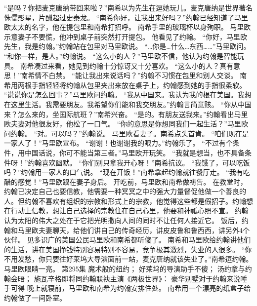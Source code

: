 \documentclass[a4paper,12pt,UTF8,twoside]{ctexbook}
\begin{document}
        “是吗？你把麦克唐纳带回来啦？”南希以为先生在逗她玩儿。麦克唐纳是世界著名侏儒影星，片酬超过史泰龙。  
        “南希你好，让我出来好吗？”约翰已经知道了马里欧太太的名字，他在提包里和南希打招呼。  
        南希手里的玻璃杯以身殉职。  
        马里欧示意妻子不要慌，他冲到桌子前突然打开提包。  
        他看见了约翰。  
        “你好，马里欧先生，我是约翰。”约翰站在包里对马里欧说。  
        “…你是…什么…东西……”马里欧问。  
        “和你一样，是人。”约翰说。  
        “这么小的人？”马里欧不信，他认为约翰是智能玩具。  
        南希凑过来看，她见到约翰十分惊讶又十分喜欢。  
        “这么小的人？真有意思！”南希情不白禁。  
        “能让我出来说话吗？”约翰不习惯在包里和别人交谈。  
        南希用两根手指轻轻将约翰从包里夹出来放在桌子上，约翰感到她的手指很柔软。  
        “说说你是怎么回事？”马里欧问约翰。  
        “我从中国来。我认为我的根在美国。我想在这里生活。我需要朋友。我希望你们能和我交朋友。”约翰言简意赅。        
        “你从中国来？怎么来的，坐国际航班？”南希兴奋。  
        “是的。有朋友送我来。”约翰看出马里欧夫妻对他很友好，他松了一口气。  
        “你的意思是你想同我们一起生活？”马里欧问约翰。  
        “对。可以吗？”约翰说。  
        马里欧看妻子。南希点头首肯。  
        “咱们现在是一家人了！”马里欧宣布。  
        “谢谢！也谢谢我的眼力。”约翰乐了。  
        “不过有个条件，用中国话说，你可不能当第三者。”马里欧开玩笑。  
        “我就是想当，也不具备条件呀！”约翰喜欢幽默。  
        “你们别只拿我开心呀！”南希抗议。  
        “我饿了，可以吃饭吗？”约翰用一家人的口气说。  
        “现在开饭！”南希拿起约翰就往餐厅走。  
        “我有吃醋的感觉！”马里欧跟在妻子身后。  
        开吃前，马里欧和南希做祷告。  
        在教堂时，约翰已决定自己也要信教，他需要一种冥冥之中的强大力量督促他做一个善良的人。但约翰不喜欢有组织的宗教和形式上的宗教，他觉得这些都是假招子。约翰想在行动上信教，想让自己选择的宗教住在自己心里，他要和神祗心照不宣。  
        约翰认为太阳的伟大之处在于它把光明撒向人间的同时不让任何人接近它。  
        饭后，约翰和马里欧夫妻聊天，给他们讲自己的传奇经历，讲皮皮鲁和鲁西西，讲另外4个伙伴。  
        见多识广的美国公民马里欧和南希都听傻了。  
        南希和马里欧给约翰讲他们的生活，讲在美国挣钱特别容易特别不容易，竞争极其激烈，失业的人很多。  
        “你不用发愁，你只要往好莱坞大导演面前一站，麦克唐纳就该失业了。”南希逗约翰。  
        马里欧眼睛一亮。          第295集  
        魔术般的纽约；  
        好莱坞的导演助手不傻；  
        汤约拿与约翰会晤；  
        施瓦辛格即将同约翰联袂主演《两极世界》：  
        豪华别墅对于约翰来说唾手可得    
        晚上就寝前，马里欧和南希为约翰安排住处。  
        南希用一个漂亮的纸盒子给约翰做了一间卧室。  
\end{document}
